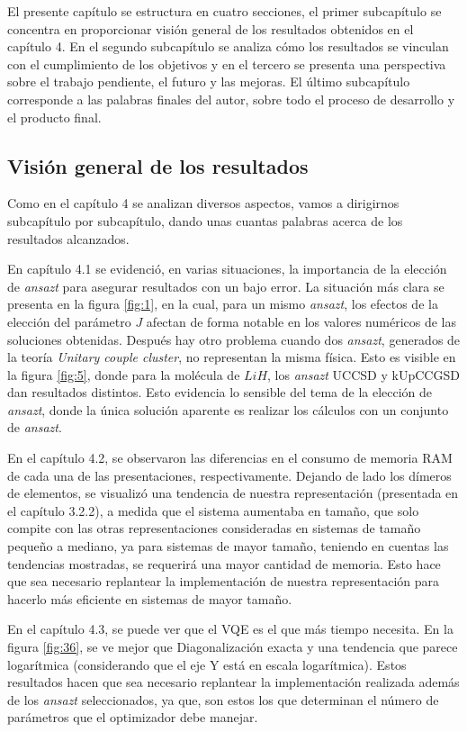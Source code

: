 El presente capítulo se estructura en cuatro secciones, el primer subcapítulo se concentra en proporcionar visión general de los resultados obtenidos en el capítulo 4. En el segundo subcapítulo se analiza cómo los resultados se vinculan con el cumplimiento de los objetivos y en el tercero se presenta una perspectiva sobre el trabajo pendiente, el futuro y las mejoras. El último subcapítulo corresponde a las palabras finales del autor, sobre todo el proceso de desarrollo y el producto final.

\subsection{Visión general de los resultados}
Como en el capítulo 4 se analizan diversos aspectos, vamos a dirigirnos subcapítulo por subcapítulo, dando unas cuantas palabras acerca de los resultados alcanzados.

En capítulo 4.1 se evidenció, en varias situaciones, la importancia de la elección de \textit{ansazt} para asegurar resultados con un bajo error. La situación más clara se presenta en la figura \ref{fig:1}, en la cual, para un mismo \textit{ansazt}, los efectos de la elección del parámetro $J$ afectan de forma notable en los valores numéricos de las soluciones obtenidas. Después hay otro problema cuando dos \textit{ansazt}, generados de la teoría \textit{Unitary couple cluster}, no representan la misma física. Esto es visible en la figura \ref{fig:5}, donde para la molécula de $LiH$, los \textit{ansazt} UCCSD y kUpCCGSD dan resultados distintos. Esto evidencia lo sensible del tema de la elección de \textit{ansazt}, donde la única solución aparente es realizar los cálculos con un conjunto de \textit{ansazt}.

En el capítulo 4.2, se observaron las diferencias en el consumo de memoria RAM de cada una de las presentaciones, respectivamente. Dejando de lado los dímeros de elementos, se visualizó una tendencia de nuestra representación (presentada en el capítulo 3.2.2), a medida que el sistema aumentaba en tamaño, que solo compite con las otras representaciones consideradas en sistemas de tamaño pequeño a mediano, ya para sistemas de mayor tamaño, teniendo en cuentas las tendencias mostradas, se requerirá una mayor cantidad de memoria. Esto hace que sea necesario replantear la implementación de nuestra representación para hacerlo más eficiente en sistemas de mayor tamaño.

En el capítulo 4.3, se puede ver que el VQE es el que más tiempo necesita. En la figura \ref{fig:36}, se ve mejor que Diagonalización exacta y una tendencia que parece logarítmica (considerando que el eje Y está en escala logarítmica). Estos resultados hacen que sea necesario replantear la implementación realizada además de los \textit{ansazt} seleccionados, ya que, son estos los que determinan el número de parámetros que el optimizador debe manejar.

